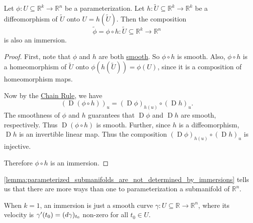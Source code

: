 \documentclass[notoc,notitlepage]{tufte-book}
\DeclareMathOperator{\D}{D}
\begin{document}
\begin{lemma}\label{lemma:parameterized_submanifolds_are_not_determined_by_immersions}
  Let $\phi : U \subseteq \mathbb{R}^k \to \mathbb{R}^n$ be a parameterization.
  Let $h : \tilde{U} \subseteq \mathbb{R}^k \to \mathbb{R}^k$ be a
  diffeomorphism of $\tilde{U}$ onto $U = h(\tilde{U})$. Then the composition
  \begin{equation*}
    \tilde{\phi} = \phi \circ h : \tilde{U} \subseteq \mathbb{R}^k \to
    \mathbb{R}^n
  \end{equation*}
  is also an immersion.
\end{lemma}

\begin{proof}
  First, note that $\phi$ and $h$ are both
  \hyperref[defn:smoothness]{smooth}. So $\phi \circ h$ is smooth.
  Also, $\phi \circ h$ is a homeomorphism of $\tilde{U}$ onto
  $\phi(h(\tilde{U})) = \phi(U)$, since it is a composition of homeomorphism
  maps.

  Now by the \hyperref[thm:the_chain_rule]{Chain Rule}, we have
  \begin{equation*}
    (\D ( \phi \circ h ))_u = (\D \phi)_{h(u)} \circ (\D h)_{u}.
  \end{equation*}
  The smoothness of $\phi$ and $h$ guarantees that $\D \phi$ and $\D h$ are
  smooth, respectively. Thus $\D ( \phi \circ h )$ is smooth. Further, since $h$
  is a diffeomorphism, $\D h$ is an invertible linear map. Thus the composition
  $(\D \phi)_{h(u)} \circ (\D h)_u$ is injective.

  Therefore $\phi \circ h$ is an immersion.
\end{proof}

\begin{note}
  \cref{lemma:parameterized_submanifolds_are_not_determined_by_immersions} tells
  us that there are more ways than one to parameterization a submanifold of
  $\mathbb{R}^n$.
\end{note}

\begin{note}
  When $k = 1$, an immersion is just a smooth curve $\gamma : U \subseteq
  \mathbb{R} \to \mathbb{R}^n$, where its velocity is $\gamma' (t_0) =
  (\mathop{}\!d{\gamma})_{t_0}$ non-zero for all $t_0 \in U$.
\end{note}
\end{document}
